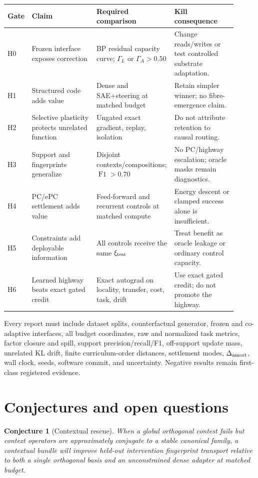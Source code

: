 \documentclass[11pt]{article}
\newtheorem{conjecture}[definition]{Conjecture}
\newcommand{\Fone}{\operatorname{F1}}
\begin{document}
\begin{center}
\small
\begin{tabular}{@{}p{0.07\linewidth}p{0.28\linewidth}p{0.29\linewidth}p{0.27\linewidth}@{}}
\toprule
Gate & Claim & Required comparison & Kill consequence\\
\midrule
H0 & Frozen interface exposes correction &
BP residual capacity curve; $\Gamma_L$ or $\Gamma_A>0.50$ &
Change reads/writes or test controlled substrate adaptation.\\
H1 & Structured code adds value &
Dense and SAE+steering at matched budget &
Retain simpler winner; no fibre-emergence claim.\\
H2 & Selective plasticity protects unrelated function &
Ungated exact gradient, replay, isolation &
Do not attribute retention to causal routing.\\
H3 & Support and fingerprints generalize &
Disjoint contexts/compositions; $\Fone>0.70$ &
No PC/highway escalation; oracle masks remain diagnostics.\\
H4 & PC/ePC settlement adds value &
Feed-forward and recurrent controls at matched compute &
Energy descent or clamped success alone is insufficient.\\
H5 & Constraints add deployable information &
All controls receive the same $\xi_{\rm test}$ &
Treat benefit as oracle leakage or ordinary control capacity.\\
H6 & Learned highway beats exact gated credit &
Exact autograd on locality, transfer, cost, task, drift &
Use exact gated credit; do not promote the highway.\\
\bottomrule
\end{tabular}
\end{center}

Every report must include dataset splits, counterfactual generator, frozen and
co-adaptive interfaces, all budget coordinates, raw and normalized task
metrics, factor closure and spill, support precision/recall/F1, off-support
update mass, unrelated KL drift, finite curriculum-order distances, settlement
modes, $\Delta_{\rm amort}$, wall clock, seeds, software commit, and uncertainty.
Negative results remain first-class registered evidence.

\section{Conjectures and open questions}

\begin{conjecture}[Contextual rescue]
When a global orthogonal contest fails but context operators are approximately
conjugate to a stable canonical family, a contextual bundle will improve
held-out intervention fingerprint transport relative to both a single
orthogonal basis and an unconstrained dense adapter at matched budget.
\end{conjecture}
\end{document}
